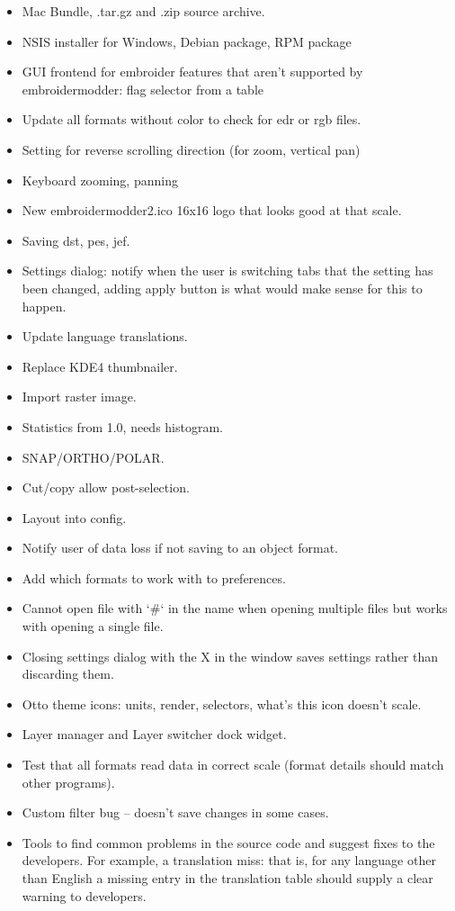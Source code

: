 \documentclass[11pt]{report}
\begin{document}
\begin{itemize}
  \item Mac Bundle, .tar.gz and .zip source archive.
  \item NSIS installer for Windows, Debian package, RPM package
  \item GUI frontend for embroider features that aren't supported by embroidermodder: flag selector from a table
  \item Update all formats without color to check for edr or rgb files.
  \item Setting for reverse scrolling direction (for zoom, vertical pan)
  \item Keyboard zooming, panning
  \item New embroidermodder2.ico 16x16 logo that looks good at that scale.
  \item Saving dst, pes, jef.
  \item Settings dialog: notify when the user is switching tabs that the setting has been changed, adding apply button is what would make sense for this to happen.
  \item Update language translations.
  \item Replace KDE4 thumbnailer.
  \item Import raster image.
  \item Statistics from 1.0, needs histogram.
  \item SNAP/ORTHO/POLAR.
  \item Cut/copy allow post-selection.
  \item Layout into config.
  \item Notify user of data loss if not saving to an object format.
  \item Add which formats to work with to preferences.
  \item Cannot open file with `\#` in the name when opening multiple files but works with opening a single file.
  \item Closing settings dialog with the X in the window saves settings rather than discarding them.
  \item Otto theme icons: units, render, selectors, what's this icon doesn't scale.
  \item Layer manager and Layer switcher dock widget.
  \item Test that all formats read data in correct scale (format details should match other programs).
  \item Custom filter bug -- doesn't save changes in some cases.
  \item Tools to find common problems in the source code and suggest fixes to the developers. For example, a translation miss: that is, for any language other than English a missing entry in the translation table should supply a clear warning to developers.

\end{itemize}
\end{document}

